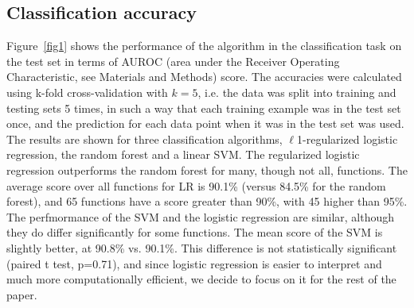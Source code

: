 \documentclass[10pt,letterpaper]{article}
\begin{document}
\subsection*{Classification accuracy}
Figure~\ref{fig1} shows the performance of the algorithm in the classification task on the test set in terms of AUROC (area under the Receiver Operating Characteristic, see Materials and Methods) score. The accuracies were calculated using k-fold cross-validation with $k=5$, i.e. the data was split into training and testing sets 5 times, in such a way that each training example was in the test set once, and the prediction for each data point when it was in the test set was used.  The results are shown for three classification algorithms, $\ell$1-regularized logistic regression, the random forest and a linear SVM. The regularized logistic regression outperforms the random forest for many, though not all, functions. The average score over all functions for LR is 90.1\% (versus 84.5\% for the random forest), and 65 functions have a score greater than 90\%, with 45 higher than 95\%. The perfmormance of the SVM and the logistic regression are similar, although they do differ significantly for some functions. The mean score of the SVM is slightly better, at 90.8\% vs. 90.1\%. This difference is not statistically significant (paired t test, p=0.71), and since logistic regression is easier to interpret and much more computationally efficient, we decide to focus on it for the rest of the paper.
\end{document}
